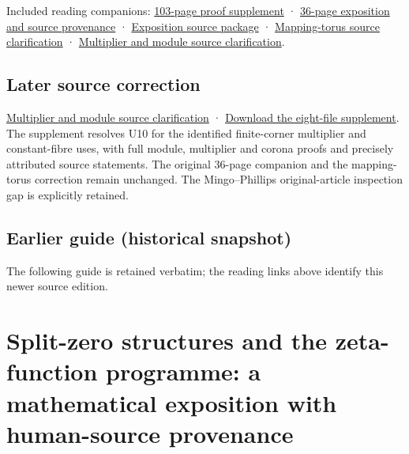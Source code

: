\documentclass[
]{article}
\begin{document}
Included reading companions:
\href{https://zenodo.org/api/records/22814080/files/91-splitzero-original-period-mixed-profile-supplement.pdf/content}{103-page
proof supplement} ·
\href{https://zenodo.org/api/records/22814080/files/85-splitzero-exposition-provenance-reader.pdf/content}{36-page
exposition and source provenance} ·
\href{https://zenodo.org/api/records/22814080/files/86-splitzero-exposition-provenance-sources.zip/content}{Exposition
source package} ·
\href{https://zenodo.org/api/records/22814080/files/87-splitzero-mapping-torus-conventions.zip/content}{Mapping-torus
source clarification} ·
\href{https://zenodo.org/api/records/22814080/files/88-splitzero-multiplier-functoriality.zip/content}{Multiplier
and module source clarification}.

\subsection{Later source correction}\label{later-source-correction}

\href{https://github.com/KokunoYumeto/zeta-function-research-reader/blob/main/workbenches/splitzero-tandem/source-corrections/20260917-multiplier-functoriality/README.md}{Multiplier
and module source clarification} ·
\href{https://raw.githubusercontent.com/KokunoYumeto/zeta-function-research-reader/main/workbenches/splitzero-tandem/source-corrections/20260917-multiplier-functoriality/multiplier-source-clarification-2026-09-17.zip}{Download
the eight-file supplement}. The supplement resolves U10 for the
identified finite-corner multiplier and constant-fibre uses, with full
module, multiplier and corona proofs and precisely attributed source
statements. The original 36-page companion and the mapping-torus
correction remain unchanged. The Mingo--Phillips original-article
inspection gap is explicitly retained.

\subsection{Earlier guide (historical
snapshot)}\label{earlier-guide-historical-snapshot-5}

The following guide is retained verbatim; the reading links above
identify this newer source edition.

\section{Split-zero structures and the zeta-function programme: a
mathematical exposition with human-source
provenance}\label{split-zero-structures-and-the-zeta-function-programme-a-mathematical-exposition-with-human-source-provenance}
\end{document}
